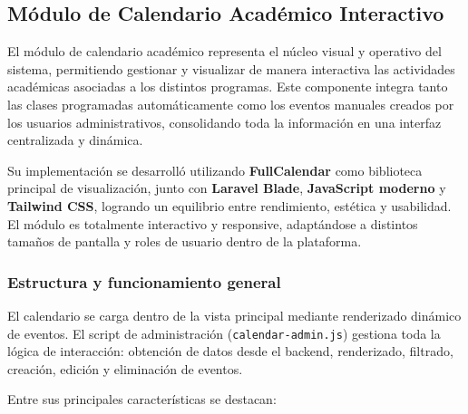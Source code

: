 \subsection{Módulo de Calendario Académico Interactivo}

El módulo de calendario académico representa el núcleo visual y operativo del sistema, permitiendo gestionar y visualizar de manera interactiva las actividades académicas asociadas a los distintos programas. Este componente integra tanto las clases programadas automáticamente como los eventos manuales creados por los usuarios administrativos, consolidando toda la información en una interfaz centralizada y dinámica.

Su implementación se desarrolló utilizando \textbf{FullCalendar} como biblioteca principal de visualización, junto con \textbf{Laravel Blade}, \textbf{JavaScript moderno} y \textbf{Tailwind CSS}, logrando un equilibrio entre rendimiento, estética y usabilidad. El módulo es totalmente interactivo y responsive, adaptándose a distintos tamaños de pantalla y roles de usuario dentro de la plataforma.

\subsubsection{Estructura y funcionamiento general}

El calendario se carga dentro de la vista principal mediante renderizado dinámico de eventos. El script de administración (\texttt{calendar-admin.js}) gestiona toda la lógica de interacción: obtención de datos desde el backend, renderizado, filtrado, creación, edición y eliminación de eventos.

Entre sus principales características se destacan:

